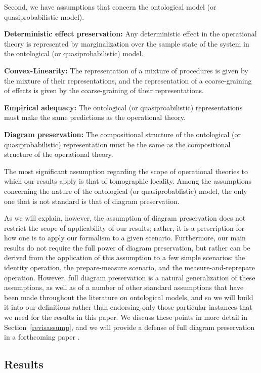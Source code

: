 \documentclass[10pt,twocolumn,aps,groupedaddress,nofootinbib]{revtex4}
\begin{document}
Second, we have assumptions that concern the ontological model (or quasiprobabilistic model).
\ben
\item {\bf Deterministic effect preservation:} Any deterministic effect in the operational theory is represented by marginalization over the  sample 
 state of the system in the ontological (or quasiprobabilistic) model.
\item {\bf Convex-Linearity:} The representation of a mixture of procedures is given by the mixture of their representations, and the representation of a coarse-graining of effects is given by the coarse-graining of their representations.
\item {\bf Empirical adequacy:} The ontological (or quasiproabilistic) representations must make the same predictions as the operational theory.
\item {\bf Diagram preservation:} The compositional structure of the ontological (or quasiprobabilistic) representation must be the same as the compositional structure of the operational theory.
\een

The most significant assumption regarding the scope of operational theories to which our results apply is that of tomographic locality.   Among the assumptions concerning the nature of the ontological (or quasiprobablistic) model, the only one that is not standard is that of diagram preservation.

As we will explain,
however, the assumption of
diagram preservation does not restrict the scope of applicability of our results; rather, it is a prescription for how one is to apply our formalism to a given scenario.
Furthermore, our main results do not require the full power of diagram preservation, but rather can be derived from the application of this assumption to a few simple scenarios: the identity operation, the prepare-measure scenario, and the measure-and-reprepare operation.
However, full diagram preservation is a natural generalization of these assumptions, as well as of a number of other standard assumptions that have been made throughout the literature on ontological models, and so we will build it into our definitions rather than endorsing only those particular instances that we need for the results in this paper.
We discuss these points in more detail in Section~\ref{revisassump}, and we will provide a defense of full diagram preservation in a forthcoming paper \cite{schmid2020unscrambling}.



\subsection{Results}
\end{document}
